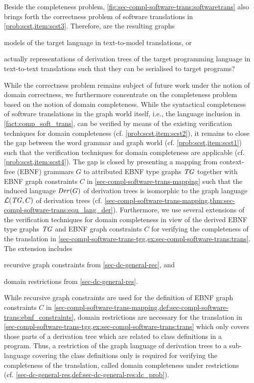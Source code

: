 Beside the completeness problem, \cref{fig:sec-compl-software-trans:softwaretrans} also brings forth the correctness problem of software translations in \cref{prob:scst,item:scst3}.
Therefore, are the resulting graphs 
\begin{enumerate*}
\item models of the target language in text-to-model translations, or
\item actually representations of derivation trees of the target programming language in text-to-text translations such that they can be serialised to target programs?
\end{enumerate*}
While the correctness problem remains subject of future work under the notion of domain correctness, we furthermore concentrate on the completeness problem based on the notion of domain completeness.
While the syntactical completeness of software translations in the graph world itself, i.e., the language inclusion in \cref{fact:comp_soft_trans}, can be verified by means of the existing verification techniques for domain completeness (cf. \cref{prob:scst,item:scst2}), it remains to close the gap between the word grammar and graph world (cf. \cref{prob:scst,item:scst1}) such that the verification techniques for domain completeness are applicable (cf. \cref{prob:scst,item:scst4}).
The gap is closed by presenting a mapping from context-free (EBNF) grammars $G$ to attributed EBNF type graphs $\mathit{TG}$ together with EBNF graph constraints $C$ in \cref{sec-compl-software-trans-mapping} such that the induced language $\mathit{Der}(G)$ of derivation trees is isomorphic to the graph language $\mathcal{L}(\mathit{TG},C)$ of derivation trees (cf. \cref{sec-compl-software-trans-mapping,thm:sec-compl-software-trans:equ_lang_der}).
Furthermore, we use several extensions of the verification techniques for domain completeness in view of the derived EBNF type graphs $\mathit{TG}$ and EBNF graph constraints $C$ for verifying the completeness of the translation in \cref{sec-compl-software-trans-tgg,ex:sec-compl-software-trans:trans}.
The extension includes
\begin{enumerate*}
\item recursive graph constraints from \cref{sec-dc-general-rec}, and
\item domain restrictions from \cref{sec-dc-general-res}.
\end{enumerate*}
While recursive graph constraints are used for the definition of EBNF graph constraints $C$ in \cref{sec-compl-software-trans-mapping,def:sec-compl-software-trans:ebnf_constraints}, domain restrictions are necessary for the translation in \cref{sec-compl-software-trans-tgg,ex:sec-compl-software-trans:trans} which only covers those parts of a derivation tree which are related to class definitions in a program.
Thus, a restriction of the graph language of derivation trees to a sub-language covering the class definitions only is required for verifying the completeness of the translation, called domain completeness under restrictions (cf. \cref{sec-dc-general-res,def:sec-dc-general-res:dc_prob}).